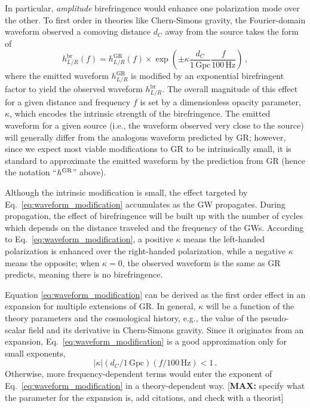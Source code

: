 \documentclass[aps,prd,twocolumn,superscriptaddress,preprintnumbers,floatfix,nofootinbib]{revtex4-2}
\newcommand*{\mi}[1]{\textsf{\color{magenta} [\textbf{MAX:} #1]}}
\begin{document}
In particular, \emph{amplitude} birefringence would enhance one polarization mode over the other.
To first order in theories like Chern-Simons gravity, the Fourier-domain waveform observed a comoving distance $d_C$ away from the source takes the form of
\begin{equation}
    h_{L/R}^{\mathrm{br}}(f) =
    h_{L/R}^{\mathrm{GR}}(f) \times
    \exp\left(\pm\kappa\frac{d_C}{1\, \mathrm{Gpc}}\frac{f}{100\,\mathrm{Hz}}\right)\,,
    \label{eq:waveform_modification}
\end{equation}
where the emitted waveform $h_{L/R}^{\mathrm{GR}}$ is modified by an exponential birefringent factor to yield the observed waveform $h_{L/R}^{\mathrm{br}}$.
The overall magnitude of this effect for a given distance and frequency $f$ is set by a dimensionless opacity parameter, $\kappa$, which encodes the intrinsic strength of the birefringence.
The emitted waveform for a given source (i.e., the waveform observed very close to the source) will generally differ from the analogous waveform predicted by \ac{GR}; however, since we expect most viable modifications to \ac{GR} to be intrinsically small, it is standard to approximate the emitted waveform by the prediction from \ac{GR} (hence the notation ``$h^{\rm GR}$'' above).

Although the intrinsic modification is small, the effect targeted by Eq.~\eqref{eq:waveform_modification} accumulates as the \ac{GW} propagates.
During propagation, the effect of birefringence will be built up with the number of cycles which depends on the distance traveled and the frequency of the \acp{GW}.
According to Eq.~\eqref{eq:waveform_modification}, a positive $\kappa$ means the left-handed polarization is enhanced over the right-handed polarization, while a negative $\kappa$ means the opposite;
when $\kappa=0$, the observed waveform is the same as \ac{GR} predicts, meaning there is no birefringence.

Equation \eqref{eq:waveform_modification} can be derived as the first order effect in an expansion for multiple extensions of \ac{GR}.
In general, $\kappa$ will be a function of the theory parameters and the cosmological history, e.g., the value of the pseudo-scalar field and its derivative in Chern-Simons gravity.
Since it originates from an expansion, Eq.~\eqref{eq:waveform_modification} is a good approximation only for small exponents, 
\begin{equation}
\left|\kappa\right| \left(d_C/1\,\mathrm{Gpc}\right) \left(f/100\, \mathrm{Hz}\right) < 1\, .
\end{equation}
Otherwise, more frequency-dependent terms would enter the exponent of Eq.~\eqref{eq:waveform_modification} in a theory-dependent way.
\mi{specify what the parameter for the expansion is, add citations, and check with a theorist}
\end{document}

